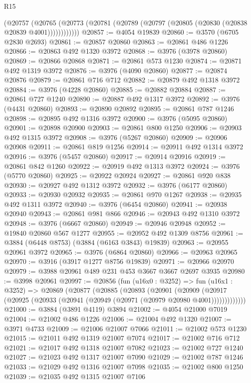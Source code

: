 \begin{lexlean}{R15}
\begin{coremodule}
          (@20757
            (@20765 (@20773 (@20781 (@20789 (@20797 (@20805 (@20830 (@20838 @20839 @4001))))))))))))
@20857 := @4054 @19839
@20860 := @3570 (@6705 @2830 @2693)
@20861 := @20857 @20860
@20863 := @20861 @486 @1226
@20866 := @20863 @492 @1320 @3972
@20868 := @3976 (@3978 @20860)
@20869 := @20866 @20868
@20871 := @20861 @573 @1230
@20874 := @20871 @492 @1319 @3972
@20876 := @3976 (@4090 @20860)
@20877 := @20874 @20876
@20879 := @20861 @716 @712
@20882 := @20879 @492 @1318 @3972
@20884 := @3976 (@4228 @20860)
@20885 := @20882 @20884
@20887 := @20861 @727 @1240
@20890 := @20887 @492 @1317 @3972
@20892 := @3976 (@4431 @20860)
@20893 := @20890 @20892
@20895 := @20861 @787 @1246
@20898 := @20895 @492 @1316 @3972
@20900 := @3976 (@5095 @20860)
@20901 := @20898 @20900
@20903 := @20861 @800 @1250
@20906 := @20903 @492 @1315 @3972
@20908 := @3976 (@5267 @20860)
@20909 := @20906 @20908
@20911 := @20861 @819 @1256
@20914 := @20911 @492 @1314 @3972
@20916 := @3976 (@5457 @20860)
@20917 := @20914 @20916
@20919 := @20861 @842 @1260
@20922 := @20919 @492 @1313 @3972
@20924 := @3976 (@5770 @20860)
@20925 := @20922 @20924
@20927 := @20861 @920 @838
@20930 := @20927 @492 @1312 @3972
@20932 := @3976 (@6177 @20860)
@20933 := @20930 @20932
@20935 := @20861 @970 @1267
@20938 := @20935 @492 @1311 @3972
@20940 := @3976 (@6454 @20860)
@20941 := @20938 @20940
@20943 := @20861 @981 @866
@20946 := @20943 @492 @1310 @3972
@20948 := @3976 (@6667 @20860)
@20949 := @20946 @20948
@20952 := @19840 @20860 @567 @1277
@20955 := @20952 @492 @1309 @8756
@20961 := @3884 (@6448 @8753) (@3884 (@6163 @3843) @19839)
@20963 := @20955 @20961 @3972
@20965 := @3976 (@6864 @20860)
@20966 := @20963 @20965
@20970 := @3916 (@3917 @1277 @8756 @19839)
@20971 := @20966 @20970
@20979 := @3988 @20961 @489 @231 @453 @3667 @3667 @2697 @3935
@20980 := @3998 @20961
@20997 := @20856
    (fun (u16x0 : @3252) =>
    fun (u16x1 : @3252) =>
    @20869
      (@20877
        (@20885
          (@20893
            (@20901
              (@20909
                (@20917 (@20925 (@20933 (@20941 (@20949 (@20971 (@20979 @20980 @4001)))))))))))))
@21000 := @3884 (@3891 @4119) @3894
@21002 := @4054 @21000 @7019
@21004 := @21002 @486 @1226
@21006 := @21004 @492 @1320
@21007 := @3971 @4733
@21009 := @21006 @21007 @7066
@21011 := @21002 @573 @1230
@21015 := @21011 @492 @1319 @21007 @7074
@21017 := @21002 @716 @712
@21021 := @21017 @492 @1318 @21007 @7082
@21023 := @21002 @727 @1240
@21027 := @21023 @492 @1317 @21007 @7090
@21029 := @21002 @787 @1246
@21033 := @21029 @492 @1316 @21007 @7098
@21035 := @21002 @800 @1250
@21039 := @21035 @492 @1315 @21007 @7106

\end{coremodule}
\end{lexlean}
